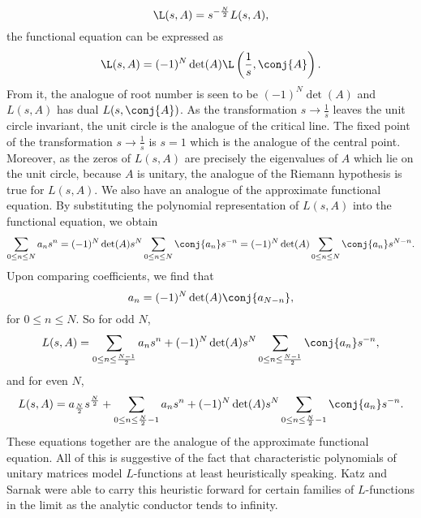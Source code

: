       \[
        \L(s,A) = s^{-\frac{N}{2}}L(s,A),
      \]
      the functional equation can be expressed as
      \[
         \L(s,A) = (-1)^{N}\det(A) \L\left(\frac{1}{s},\conj{A}\right).
      \]
      From it, the analogue of root number is seen to be $(-1)^{N}\det(A)$ and $L(s,A)$ has dual $L(s,\conj{A})$. As the transformation $s \to \frac{1}{s}$ leaves the unit circle invariant, the unit circle is the analogue of the critical line. The fixed point of the transformation $s \to \frac{1}{s}$ is $s = 1$ which is the analogue of the central point. Moreover, as the zeros of $L(s,A)$ are precisely the eigenvalues of $A$ which lie on the unit circle, because $A$ is unitary, the analogue of the Riemann hypothesis is true for $L(s,A)$. We also have an analogue of the approximate functional equation. By substituting the polynomial representation of $L(s,A)$ into the functional equation, we obtain
      \[
        \sum_{0 \le n \le N}a_{n}s^{n} = (-1)^{N}\det(A)s^{N}\sum_{0 \le n \le N}\conj{a_{n}}s^{-n} = (-1)^{N}\det(A)\sum_{0 \le n \le N}\conj{a_{n}}s^{N-n}.
      \]
      Upon comparing coefficients, we find that
      \[
        a_{n} = (-1)^{N}\det(A)\conj{a_{N-n}},
      \]
      for $0 \le n \le N$. So for odd $N$,
      \[
        L(s,A) = \sum_{0 \le n \le \frac{N-1}{2}}a_{n}s^{n}+(-1)^{N}\det(A)s^{N}\sum_{0 \le n \le \frac{N-1}{2}}\conj{a_{n}}s^{-n},
      \]
      and for even $N$,
      \[
        L(s,A) = a_{\frac{N}{2}}s^{\frac{N}{2}}+\sum_{0 \le n \le \frac{N}{2}-1}a_{n}s^{n}+(-1)^{N}\det(A)s^{N}\sum_{0 \le n \le \frac{N}{2}-1}\conj{a_{n}}s^{-n}.
      \]
      These equations together are the analogue of the approximate functional equation. All of this is suggestive of the fact that characteristic polynomials of unitary matrices model $L$-functions at least heuristically speaking. Katz and Sarnak were able to carry this heuristic forward for certain families of $L$-functions in the limit as the analytic conductor tends to infinity.
